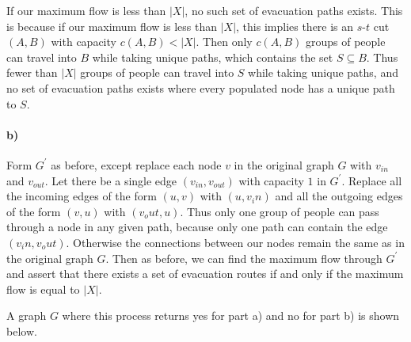 \documentclass[12pt]{article}
\begin{document}
If our maximum flow is less than \(|X|\), no such set of evacuation paths exists. This is because if our maximum flow is less than \(|X|\), this implies there
is an \(s\)-\(t\) cut \((A,B)\) with capacity \(c(A,B)<|X|\). Then only \(c(A,B)\) groups of people can travel into \(B\) while taking unique paths, which
contains the set \(S\subseteq B\). Thus fewer than \(|X|\) groups of people can travel into \(S\) while taking unique paths, and no set of evacuation paths exists where
every populated node has a unique path to \(S\).

\paragraph{b)}

Form \(G^\prime\) as before, except replace each node \(v\) in the original graph \(G\) with \(v_{in}\) and \(v_{out}\). Let there be a single edge \((v_{in},v_{out})\)
with capacity \(1\) in \(G^\prime\). Replace all the incoming edges of the form \((u,v)\) with \((u,v_in)\) and all the outgoing edges of the form \((v,u)\) with \((v_out,u)\).
Thus only one group of people can pass through a node in any given path, because only one path can contain the edge \((v_in,v_out)\). Otherwise the connections between
our nodes remain the same as in the original graph \(G\). Then as before, we can find the maximum flow through \(G^\prime\) and assert that there exists a set of evacuation routes if and only if the maximum flow is equal to \(|X|\).

A graph \(G\) where this process returns yes for part a) and no for part b) is shown below.
\end{document}
